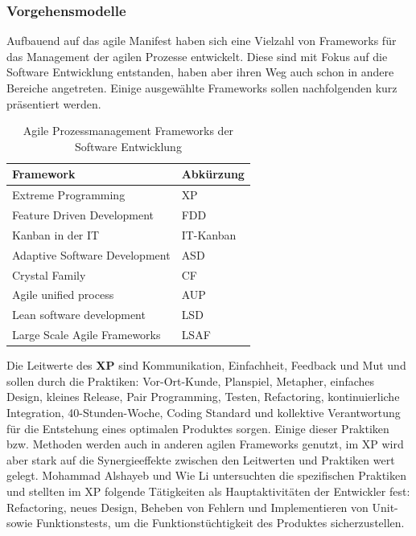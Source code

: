 \subsubsection{Vorgehensmodelle}
Aufbauend auf das agile Manifest haben sich eine Vielzahl von Frameworks für das Management der agilen Prozesse entwickelt. 
Diese sind mit Fokus auf die Software Entwicklung entstanden, haben aber ihren Weg auch schon in andere Bereiche angetreten. 
Einige ausgewählte Frameworks sollen nachfolgenden kurz präsentiert werden.
\newline
\begin{table}[]
    \centering
    \caption{Agile Prozessmanagement Frameworks der Software Entwicklung}
    \label{tab:my-table}
    \begin{tabular}{|l|l|}
    \hline
    \textbf{Framework}            & \textbf{Abkürzung} \\ \hline
    Extreme Programming           & XP                 \\ \hline
    Feature Driven Development    & FDD                \\ \hline
    Kanban in der IT              & IT-Kanban          \\ \hline
    Adaptive Software Development & ASD                \\ \hline
    Crystal Family                & CF                 \\ \hline
    Agile unified process         & AUP                \\ \hline
    Lean software development     & LSD                \\ \hline
    Large Scale Agile Frameworks  & LSAF               \\ \hline
    \end{tabular}
    \end{table}
\newline
Die Leitwerte des \textbf{XP} sind Kommunikation, Einfachheit, Feedback und Mut und sollen durch die Praktiken:
Vor-Ort-Kunde, Planspiel, Metapher, einfaches Design, kleines Release, Pair Programming, Testen, Refactoring, kontinuierliche Integration, 40-Stunden-Woche, 
Coding Standard und kollektive Verantwortung für die Entstehung eines optimalen Produktes sorgen. Einige dieser Praktiken bzw. Methoden werden auch in anderen agilen Frameworks genutzt, im XP wird aber stark auf die Synergieeffekte zwischen den Leitwerten und Praktiken wert gelegt. \cite{FOJTIK20111464}
\newline Mohammad Alshayeb und Wie Li untersuchten die spezifischen Praktiken und stellten im XP folgende Tätigkeiten als Hauptaktivitäten der Entwickler fest: 
Refactoring, neues Design, Beheben von Fehlern und Implementieren von Unit- sowie Funktionstests, um die Funktionstüchtigkeit des Produktes sicherzustellen. \cite{Alshayeb2006-nt}
\newline

